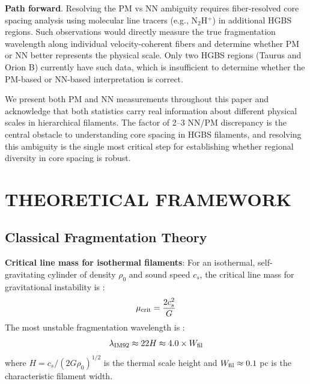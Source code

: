 \documentclass[twoside,twocolumn]{mnras}
\begin{document}
\textbf{Path forward}. Resolving the PM vs NN ambiguity requires fiber-resolved core spacing analysis using molecular line tracers (e.g., N$_2$H$^+$) in additional HGBS regions. Such observations would directly measure the true fragmentation wavelength along individual velocity-coherent fibers and determine whether PM or NN better represents the physical scale. Only two HGBS regions (Taurus and Orion B) currently have such data, which is insufficient to determine whether the PM-based or NN-based interpretation is correct.

We present both PM and NN measurements throughout this paper and acknowledge that both statistics carry real information about different physical scales in hierarchical filaments. The factor of 2--3 NN/PM discrepancy is the central obstacle to understanding core spacing in HGBS filaments, and resolving this ambiguity is the single most critical step for establishing whether regional diversity in core spacing is robust.

\section{THEORETICAL FRAMEWORK}

\subsection{Classical Fragmentation Theory}

\textbf{Critical line mass for isothermal filaments}: For an isothermal, self-gravitating cylinder of density $\rho_0$ and sound speed $c_s$, the critical line mass for gravitational instability is \citep{Ostriker1964}:
\begin{equation}
\mu_{\rm crit} = \frac{2c_s^2}{G}
\end{equation}
The most unstable fragmentation wavelength is \citep{Inutsuka1992}:
\begin{equation}
\lambda_{\rm IM92} \approx 22 H \approx 4.0 \times W_{\rm fil}
\label{eq:im92}
\end{equation}
where $H = c_s/(2G\rho_0)^{1/2}$ is the thermal scale height and $W_{\rm fil} \approx 0.1$ pc is the characteristic filament width.
\end{document}
